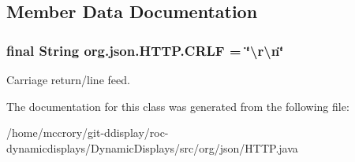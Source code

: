 \subsection{Member Data Documentation}
\hypertarget{classorg_1_1json_1_1HTTP_a7feb3304ccde0415ee29b8f997fb65b6}{
\subsubsection[{C\-R\-L\-F}]{\setlength{\rightskip}{0pt plus 5cm}final String org.\-json.\-H\-T\-T\-P.\-C\-R\-L\-F = \char`\"{}\textbackslash{}r\textbackslash{}n\char`\"{}\hspace{0.3cm}{\ttfamily [static]}}}\label{classorg_1_1json_1_1HTTP_a7feb3304ccde0415ee29b8f997fb65b6}
Carriage return/line feed. 

The documentation for this class was generated from the following file\-:\begin{DoxyCompactItemize}
\item 
/home/mccrory/git-\/ddisplay/roc-\/dynamicdisplays/\-Dynamic\-Displays/src/org/json/H\-T\-T\-P.\-java\end{DoxyCompactItemize}
